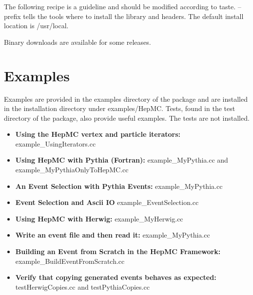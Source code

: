 \documentclass[11pt,letterpaper]{article}
\begin{document}
\vspace{0.5cm}
\begin{myitemize}
 {The following recipe is a guideline and should be modified according to taste.}
    {--prefix tells the tools where to install the library and headers.
     The default install location is /usr/local.}
\end{myitemize}

Binary downloads are available for some releases.

%
%

\section{Examples}
\label{examples}
Examples are provided in the examples directory of the package 
and are installed in the installation directory under examples/HepMC.
Tests, found in the test directory of the package, also provide useful examples.
The tests are not installed.

\begin{itemize}\setlength{\itemsep}{0pt}
  \item{\bf Using the HepMC vertex and particle iterators:}
       {example\_UsingIterators.cc} 
  \item{\bf Using HepMC with Pythia (Fortran):}
      {example\_MyPythia.cc and
       example\_MyPythiaOnlyToHepMC.cc}
  \item{\bf An Event Selection with Pythia Events:}
      {example\_MyPythia.cc}
  \item{\bf Event Selection and Ascii IO}
      {example\_EventSelection.cc}
  \item{\bf Using HepMC with Herwig:}
     {example\_MyHerwig.cc}
 \item{\bf Write an event file and then read it:}
     {example\_MyPythia.cc}
  \item{\bf Building an Event from Scratch in the HepMC Framework:}
     {example\_BuildEventFromScratch.cc}
  \item{\bf Verify that copying generated events behaves as expected:}
     {testHerwigCopies.cc and testPythiaCopies.cc}
\end{itemize}
\end{document}
